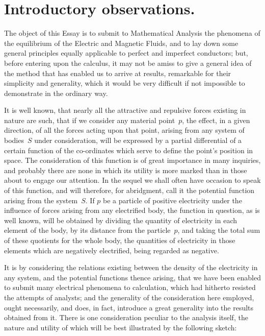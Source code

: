 \documentclass[11pt,notitlepage]{amsart}
\begin{document}
\section{Introductory observations.}
The object of this Essay is to submit to Mathematical Analysis the
phenomena of the equilibrium of the Electric and Magnetic Fluids, and to lay
down some general principles equally applicable to perfect and imperfect 
conductors; but, before entering upon the calculus, it may not be amiss to give
a general idea of the method that has enabled us to arrive at results, 
remarkable for their simplicity and generality,
which it would be very difficult if
not impossible to demonstrate in the ordinary way.

It is well known, that nearly all the attractive and repulsive forces
existing in nature are such, that if we consider any material point~$p$, the
effect, in a given direction, of all the forces acting upon that point, arising
from any system of bodies~$S$ under consideration, will be expressed by a
partial differential of a certain function of the co-ordinates which serve to
define the point's position in space. The consideration of this function is of
great importance in many inquiries, and probably there are none in which its
utility is more marked than in those about to engage our attention. In the
sequel we shall often have occasion to speak of this function, and will 
therefore, for abridgment, call it the potential
function arising from the system~$S$.
If $p$ be a particle of positive electricity
under the influence of forces arising
from any electrified body, the function in question, as is well known, will be
obtained by dividing the quantity of electricity in each element of the body,
by its distance from the particle~$p$,
and taking the total sum of these quotients
for the whole body, the quantities of electricity in those elements which are
negatively electrified, being regarded as negative.

It is by considering the relations existing between the density of the
electricity in any system, and the potential functions thence arising, that we
have been enabled to submit many electrical phenomena to calculation, which
had hitherto resisted the attempts of analysts; and the generality of the 
consideration here employed, ought necessarily, and does, in fact, introduce a
great generality into the results obtained from it. There is one consideration
peculiar to the analysis itself, the nature and utility of which will be best
illustrated by the following sketch:
\end{document}
